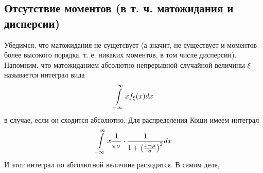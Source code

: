 \subsection{Отсутствие моментов (в т. ч. матожидания и дисперсии)}
Убедимся, что матожидания не сущетсвует (а значит, не существует и моментов более высокого порядка, т. е. никаких моментов, в том числе дисперсии).
Напомним, что матожиданием абсолютно непрерывной случайной величины $\xi$ называется интеграл вида
\begin{equation}
 \int\limits_{-\infty }^{\infty } x f_\xi (x) dx
\end{equation}
в случае, если он сходится абсолютно.
Для распределения Коши имеем интеграл
\begin{equation}\label{matozhidanie_Koshi}
 \int\limits_{-\infty }^{\infty } x \frac{1}{\pi\sigma}\cdot \frac{1}{1+ \left( \frac{x-\mu}{\sigma} \right)  ^2} dx
\end{equation}
И этот интеграл по абсолютной величине расходится.
В самом деле,
